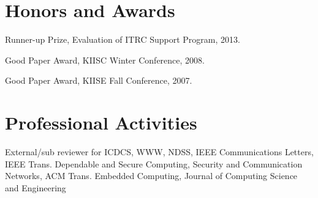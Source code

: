 \documentclass[letterpaper]{article}
\renewenvironment{itemize}{
  \begin{list}{}{
    \setlength{\leftmargin}{1.5em}
  }
}{
  \end{list}
}
\begin{document}
\section*{Honors and Awards}

\begin{itemize}
 \item Runner-up Prize, Evaluation of ITRC Support Program, 2013.
 \item Good Paper Award, KIISC Winter Conference, 2008.
 \item Good Paper Award, KIISE Fall Conference, 2007.
\end{itemize}

\section*{Professional Activities}

\begin{itemize}
\item External/sub reviewer for ICDCS, WWW, NDSS, IEEE Communications Letters, IEEE Trans. Dependable and Secure Computing, Security and Communication Networks, ACM Trans. Embedded Computing, Journal of Computing Science and Engineering
\end{itemize}
\end{document}
